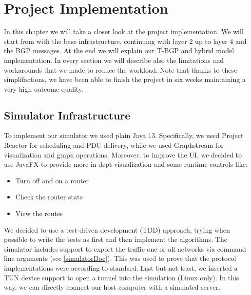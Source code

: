 \chapter{Project Implementation}
In this chapter we will take a closer look at the project implementation.
We will start from with the base infrastructure, continuing with layer 2 up to layer 4 and the BGP messages.
At the end we will explain our T-BGP and hybrid model implementation.\newline
In every section we will describe also the limitations and workarounds that we made to reduce the workload.
Note that thanks to these simplifactions, we have been able to finish the project in six weeks maintaining a very high outcome quality.

\section{Simulator Infrastructure}
To implement our simulator we used plain Java 13.
Specifically, we used Project Reactor for scheduling and PDU delivery, while we used Graphstream for visualization and graph operations.
Moreover, to improve the UI, we decided to use JavaFX to provide more in-dept visualization and some runtime controls like:
\begin{itemize}
    \item Turn off and on a router
    \item Check the router state
    \item View the routes
\end{itemize}
We decided to use a test-driven development (TDD) approach, trying when possible to write the tests as first and then implement the algorithms. \newline
The simulator includes support to export the traffic one or all networks via command line arguments (see \ref{simulatorDoc}). This was used to prove that the protocol implementations were according to standard.\newline
Last but not least, we inserted a TUN device support to open a tunnel into the simulation (Linux only).
In this way, we can directly connect our host computer with a simulated server.

